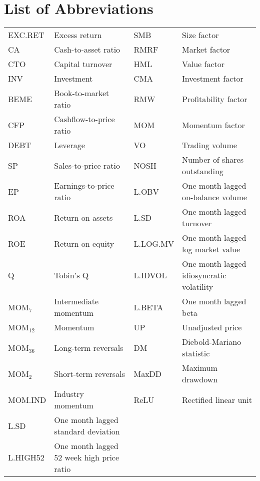\documentclass[12pt]{article}
\begin{document}
{%
    \let\oldnumberline\numberline%
    \renewcommand{\numberline}{\tablename~\oldnumberline}%
    \listoftables%
}

\newpage

\section*{List of Abbreviations}
\begin{table}[H] 
\setlength\extrarowheight{10pt}
\begin{tabularx}{\textwidth}{@{\extracolsep{4pt}} l Y l Y} 
EXC.RET & Excess return & SMB & Size factor\\ 
CA & Cash-to-asset ratio & RMRF & Market factor\\
CTO & Capital turnover & HML & Value factor\\
INV & Investment & CMA & Investment factor\\
BEME & Book-to-market ratio & RMW & Profitability factor\\
CFP & Cashflow-to-price ratio & MOM & Momentum factor\\
DEBT & Leverage & VO & Trading volume\\
SP & Sales-to-price ratio & NOSH & Number of shares outstanding\\
EP & Earnings-to-price ratio & L.OBV & One month lagged on-balance volume \\
ROA & Return on assets & L.SD & One month lagged turnover \\
ROE & Return on equity & L.LOG.MV & One month lagged log market value\\
Q & Tobin's Q & L.IDVOL & One month lagged idiosyncratic volatility \\
MOM$_7$ & Intermediate momentum & L.BETA & One month lagged beta\\
MOM$_{12}$ & Momentum & UP & Unadjusted price\\
MOM$_{36}$ & Long-term reversals & DM& Diebold-Mariano statistic\\
MOM$_{2}$ & Short-term reversals & MaxDD& Maximum drawdown\\
MOM.IND & Industry momentum & ReLU & Rectified linear unit\\
L.SD & One month lagged standard deviation & &\\
L.HIGH52 & One month lagged 52 week high price ratio & &\\
\end{tabularx}
\end{table} 
\end{document}
